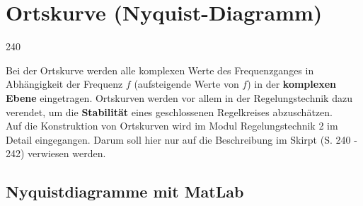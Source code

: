 \section{Ortskurve (Nyquist-Diagramm)}{240}

Bei der Ortskurve werden alle komplexen Werte des Frequenzganges in Abhängigkeit der Frequenz $f$ (aufsteigende Werte von $f$) 
in der \textbf{komplexen Ebene} eingetragen. Ortskurven werden vor allem in der Regelungstechnik dazu verendet, um die 
\textbf{Stabilität} eines geschlossenen Regelkreises abzuschätzen. \\
Auf die Konstruktion von Ortskurven wird im Modul Regelungstechnik 2 im Detail eingegangen. Darum soll hier nur auf die Beschreibung
im Skirpt (S. 240 - 242) verwiesen werden.

\subsection{Nyquistdiagramme mit MatLab}

